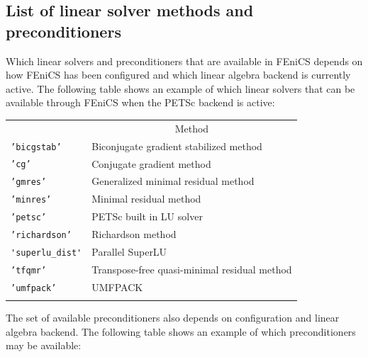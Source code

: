 \documentclass[graybox,envcountchap,sectrefs,final]{svmonodo}
\begin{document}
\subsection{List of linear solver methods and preconditioners}
\label{ftut:app:solver:prec}


Which linear solvers and preconditioners that are available
in FEniCS depends on how FEniCS has been configured and which
linear algebra backend is currently active. The following table
shows an example of which linear solvers that can be available
through FEniCS when the PETSc backend is active:

{\small   %

\vspace{4mm}

\begin{tabular}{ll}
\hline\noalign{\smallskip}
\multicolumn{1}{c}{ Name } & \multicolumn{1}{c}{ Method } \\
\noalign{\smallskip}\svhline\noalign{\smallskip}
\texttt{'bicgstab'}     & Biconjugate gradient stabilized method       \\
\texttt{'cg'}           & Conjugate gradient method                    \\
\texttt{'gmres'}        & Generalized minimal residual method          \\
\texttt{'minres'}       & Minimal residual method                      \\
\texttt{'petsc'}        & PETSc built in LU solver                     \\
\texttt{'richardson'}   & Richardson method                            \\
\Verb!'superlu_dist'! & Parallel SuperLU                             \\
\texttt{'tfqmr'}        & Transpose-free quasi-minimal residual method \\
\texttt{'umfpack'}      & UMFPACK                                      \\
\noalign{\smallskip}\hline\noalign{\smallskip}
\end{tabular}

\vspace{4mm}

}

\noindent
The set of available preconditioners also depends on configuration and
linear algebra backend. The following table shows an example of which
preconditioners may be available:
\end{document}
